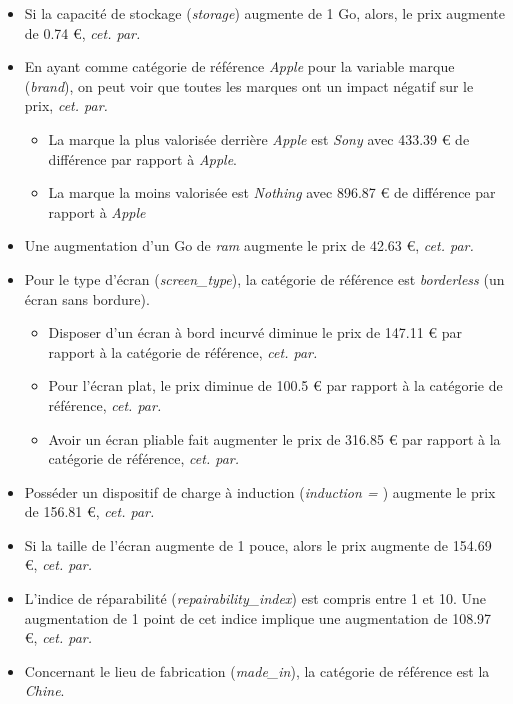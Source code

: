 \documentclass[
  12pt,
]{report}
\providecommand{\tightlist}{%
  \setlength{\itemsep}{0pt}\setlength{\parskip}{0pt}}\usepackage{longtable,booktabs,array}
\renewcommand{\texttt}[1]{\colorbox{light}{\color{highlight}{\ttfamily{#1}}}}
\begin{document}
\begin{itemize}
\item
  Si la capacité de stockage (\emph{storage}) augmente de 1 Go, alors,
  le prix augmente de 0.74 €, \emph{cet. par.}
\item
  En ayant comme catégorie de référence \emph{Apple} pour la variable
  marque (\emph{brand}), on peut voir que toutes les marques ont un
  impact négatif sur le prix, \emph{cet. par.}

  \begin{itemize}
  \tightlist
  \item
    La marque la plus valorisée derrière \emph{Apple} est \emph{Sony}
    avec 433.39 € de différence par rapport à \emph{Apple}.
  \item
    La marque la moins valorisée est \emph{Nothing} avec 896.87 € de
    différence par rapport à \emph{Apple}
  \end{itemize}
\item
  Une augmentation d'un Go de \emph{ram} augmente le prix de 42.63 €,
  \emph{cet. par.}
\item
  Pour le type d'écran (\emph{screen\_type}), la catégorie de référence
  est \emph{borderless} (un écran sans bordure).

  \begin{itemize}
  \tightlist
  \item
    Disposer d'un écran à bord incurvé diminue le prix de 147.11 € par
    rapport à la catégorie de référence, \emph{cet. par.}
  \item
    Pour l'écran plat, le prix diminue de 100.5 € par rapport à la
    catégorie de référence, \emph{cet. par.}
  \item
    Avoir un écran pliable fait augmenter le prix de 316.85 € par
    rapport à la catégorie de référence, \emph{cet. par.}
  \end{itemize}
\item
  Posséder un dispositif de charge à induction (\emph{induction =
  \texttt{TRUE}}) augmente le prix de 156.81 €, \emph{cet. par.}
\item
  Si la taille de l'écran augmente de 1 pouce, alors le prix augmente de
  154.69 €, \emph{cet. par.}
\item
  L'indice de réparabilité (\emph{repairability\_index}) est compris
  entre 1 et 10. Une augmentation de 1 point de cet indice implique une
  augmentation de 108.97 €, \emph{cet. par.}
\item
  Concernant le lieu de fabrication (\emph{made\_in}), la catégorie de
  référence est la \emph{Chine}.


\end{itemize}
\end{document}
